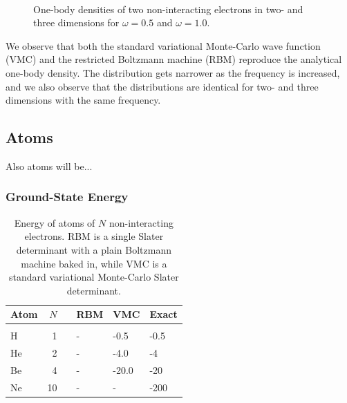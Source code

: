 \begin{figure} [h]%
	\centering
	\\
	
	\caption{One-body densities of two non-interacting electrons in two- and three dimensions for $\omega=0.5$ and $\omega=1.0$.}%
	\label{fig:OB_nointeraction}
\end{figure}

We observe that both the standard variational Monte-Carlo wave function (VMC) and the restricted Boltzmann machine (RBM) reproduce the analytical one-body density. The distribution gets narrower as the frequency is increased, and we also observe that the distributions are identical for two- and three dimensions with the same frequency.

\subsection{Atoms}
Also atoms will be...

\subsubsection{Ground-State Energy}
\begin{table} [H]
	\caption{Energy of atoms of $N$ non-interacting electrons. RBM is a single Slater determinant with a plain Boltzmann machine baked in, while VMC is a standard variational Monte-Carlo Slater determinant.}
	\label{tab:atomswointeraction}
	\begin{tabularx}{\textwidth}{lrrR{3.5cm}R{3.5cm}R{3.5cm}} \hline\hline
		Atom & $N$ & \makecell{\\ \phantom{=}} & RBM & VMC & Exact \\ \hline \\
		
		H & 1 && - & -0.5 & -0.5 \\
		He & 2 && - & -4.0 & -4 \\
		Be & 4 && - & -20.0 & -20 \\
		Ne & 10 && - & - & -200\\ \hline\hline
	\end{tabularx}
\end{table}

